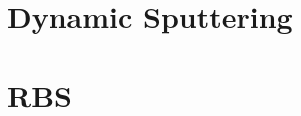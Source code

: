 \documentclass[twoside,12pt]{book}
\newcommand{\ifprivate}{\iffalse}    %
\begin{document}
\section{Dynamic Sputtering}


\section{RBS}


\ifprivate
\section{Example 2}
\footnote{This example is currently not functional.}

\fi
%
%
%

%

%
\end{document}
